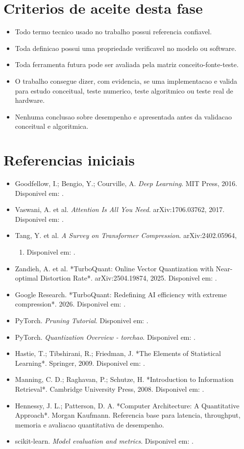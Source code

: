\section{Criterios de aceite desta fase}


\begin{itemize}
\item Todo termo tecnico usado no trabalho possui referencia confiavel.
\item Toda definicao possui uma propriedade verificavel no modelo ou software.
\item Toda ferramenta futura pode ser avaliada pela matriz conceito-fonte-teste.
\item O trabalho consegue dizer, com evidencia, se uma implementacao e valida para
estudo conceitual, teste numerico, teste algoritmico ou teste real de
hardware.
\item Nenhuma conclusao sobre desempenho e apresentada antes da validacao
conceitual e algoritmica.
\end{itemize}


\section{Referencias iniciais}


\begin{itemize}
\item Goodfellow, I.; Bengio, Y.; Courville, A. \emph{Deep Learning}. MIT Press, 2016.
Disponivel em: .
\item Vaswani, A. et al. \emph{Attention Is All You Need}. arXiv:1706.03762, 2017.
Disponivel em: .
\item Tang, Y. et al. \emph{A Survey on Transformer Compression}. arXiv:2402.05964,
\begin{enumerate}
\item Disponivel em: .
\end{enumerate}
\item Zandieh, A. et al. *TurboQuant: Online Vector Quantization with Near-optimal
Distortion Rate*. arXiv:2504.19874, 2025. Disponivel em:
.
\item Google Research. *TurboQuant: Redefining AI efficiency with extreme
compression*. 2026. Disponivel em:
.
\item PyTorch. \emph{Pruning Tutorial}. Disponivel em:
.
\item PyTorch. \emph{Quantization Overview - torchao}. Disponivel em:
.
\item Hastie, T.; Tibshirani, R.; Friedman, J. *The Elements of Statistical
Learning*. Springer, 2009. Disponivel em:
.
\item Manning, C. D.; Raghavan, P.; Schutze, H. *Introduction to Information
Retrieval*. Cambridge University Press, 2008. Disponivel em:
.
\item Hennessy, J. L.; Patterson, D. A. *Computer Architecture: A Quantitative
Approach*. Morgan Kaufmann. Referencia base para latencia, throughput,
memoria e avaliacao quantitativa de desempenho.
\item scikit-learn. \emph{Model evaluation and metrics}. Disponivel em:
.
\end{itemize}
